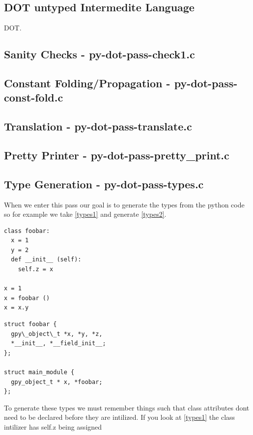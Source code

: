 \documentclass[defaultstyle,11pt]{article}
\begin{document}
\subsection{DOT untyped Intermedite Language}
DOT.

\subsection{Sanity Checks - py-dot-pass-check1.c}

\subsection{Constant Folding/Propagation - py-dot-pass-const-fold.c}

\subsection{Translation - py-dot-pass-translate.c}

\subsection{Pretty Printer - py-dot-pass-pretty\_print.c}

\subsection{Type Generation - py-dot-pass-types.c}

When we enter this pass our goal is to generate the types from the python code so for example we take \ref{types1} and generate \ref{types2}.

\begin{lstlisting}
class foobar:
  x = 1
  y = 2
  def __init__ (self):
    self.z = x

x = 1
x = foobar ()
x = x.y
\end{lstlisting}

\begin{lstlisting}
struct foobar {
  gpy\_object\_t *x, *y, *z,
  *__init__, *__field_init__;
};

struct main_module {
  gpy_object_t * x, *foobar;
};
\end{lstlisting}

To generate these types we must remember things such that class attributes dont need to be declared before they are intilized.
If you look at \ref{types1} the class intilizer has self.z being assigned
\end{document}
